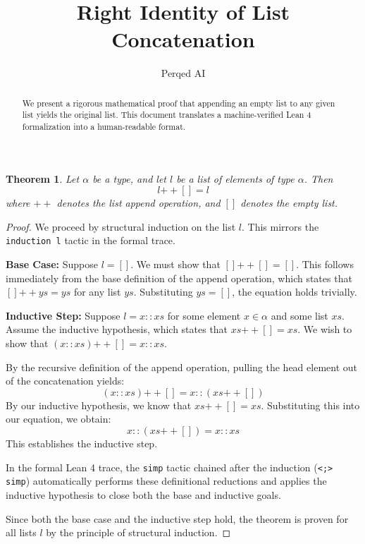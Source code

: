 \documentclass{amsart}
\title{Right Identity of List Concatenation}
\author{Perqed AI}
\newtheorem{theorem}{Theorem}
\begin{document}
\begin{abstract}
We present a rigorous mathematical proof that appending an empty list to any given list yields the original list. This document translates a machine-verified Lean 4 formalization into a human-readable format.
\end{abstract}

\maketitle

\begin{theorem}
Let $\alpha$ be a type, and let $l$ be a list of elements of type $\alpha$. Then
\[ l \mathbin{++} [] = l \]
where $++$ denotes the list append operation, and $[]$ denotes the empty list.
\end{theorem}

\begin{proof}
We proceed by structural induction on the list $l$. This mirrors the \texttt{induction l} tactic in the formal trace.

\textbf{Base Case:} Suppose $l = []$. We must show that $[] \mathbin{++} [] = []$. This follows immediately from the base definition of the append operation, which states that $[] \mathbin{++} ys = ys$ for any list $ys$. Substituting $ys = []$, the equation holds trivially.

\textbf{Inductive Step:} Suppose $l = x \mathbin{::} xs$ for some element $x \in \alpha$ and some list $xs$. Assume the inductive hypothesis, which states that $xs \mathbin{++} [] = xs$. We wish to show that $(x \mathbin{::} xs) \mathbin{++} [] = x \mathbin{::} xs$. 

By the recursive definition of the append operation, pulling the head element out of the concatenation yields:
\[ (x \mathbin{::} xs) \mathbin{++} [] = x \mathbin{::} (xs \mathbin{++} []) \]
By our inductive hypothesis, we know that $xs \mathbin{++} [] = xs$. Substituting this into our equation, we obtain:
\[ x \mathbin{::} (xs \mathbin{++} []) = x \mathbin{::} xs \]
This establishes the inductive step. 

In the formal Lean 4 trace, the \texttt{simp} tactic chained after the induction (\texttt{<;> simp}) automatically performs these definitional reductions and applies the inductive hypothesis to close both the base and inductive goals. 

Since both the base case and the inductive step hold, the theorem is proven for all lists $l$ by the principle of structural induction.
\end{proof}
\end{document}
